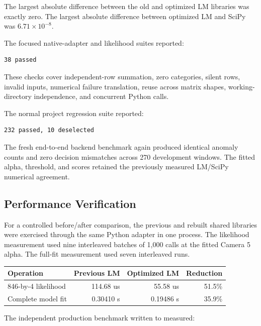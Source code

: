 \documentclass[11pt,a4paper]{article}
\begin{document}
The largest absolute difference between the old and optimized LM libraries was
exactly zero. The largest absolute difference between optimized LM and SciPy
was \(6.71\times10^{-8}\).

The focused native-adapter and likelihood suites reported:

\begin{verbatim}
38 passed
\end{verbatim}

These checks cover independent-row summation, zero categories, silent rows,
invalid inputs, numerical failure translation, reuse across matrix shapes,
working-directory independence, and concurrent Python calls.

The normal project regression suite reported:

\begin{verbatim}
232 passed, 10 deselected
\end{verbatim}

The fresh end-to-end backend benchmark again produced identical anomaly counts
and zero decision mismatches across 270 development windows. The fitted alpha,
threshold, and scores retained the previously measured LM/SciPy numerical
agreement.

\subsection{Performance Verification}

For a controlled before/after comparison, the previous and rebuilt shared
libraries were exercised through the same Python adapter in one process. The
likelihood measurement used nine interleaved batches of 1,000 calls at the
fitted Camera 5 alpha. The full-fit measurement used seven interleaved runs.

\begin{center}
\begin{tabular}{l r r r}
\textbf{Operation} & \textbf{Previous LM} & \textbf{Optimized LM} &
\textbf{Reduction} \\
\hline
846-by-4 likelihood & 114.68 us & 55.58 us & 51.5\% \\
Complete model fit & 0.30410 s & 0.19486 s & 35.9\% \\
\end{tabular}
\end{center}

The independent production benchmark written to
 measured:
\end{document}
